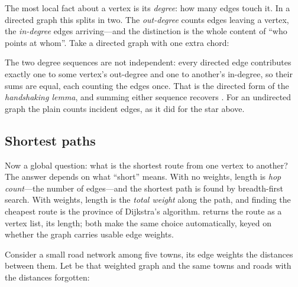 The most local fact about a vertex is its \emph{degree}: how many edges touch
it. In a directed graph this splits in two. The \emph{out-degree} counts edges
leaving a vertex, the \emph{in-degree} edges arriving---and the distinction is
the whole content of ``who points at whom''. Take a directed graph with one extra chord:

\begin{codepairs}
\end{codepairs}

The two degree sequences are not independent: every directed edge contributes
exactly one to some vertex's out-degree and one to another's in-degree, so their
sums are equal, each counting the edges once. That is the directed form of the
\emph{handshaking lemma}, and summing either sequence recovers
. For an undirected graph the plain  counts incident
edges, as it did for the star above.

\subsection{Shortest paths}
\label{ssec:graph-shortest}

Now a global question: what is the shortest route from one vertex to another?
The answer depends on what ``short'' means. With no weights, length is
\emph{hop count}---the number of edges---and the shortest path is found by
breadth-first search. With weights, length is the \emph{total weight} along the
path, and finding the cheapest route is the province of Dijkstra's
algorithm.  returns the route as a
vertex list,  its length; both make the same choice
automatically, keyed on whether the graph carries usable edge weights.

Consider a small road network among five towns, its edge weights the distances
between them. Let  be that weighted graph and  the
same towns and roads with the distances forgotten:

